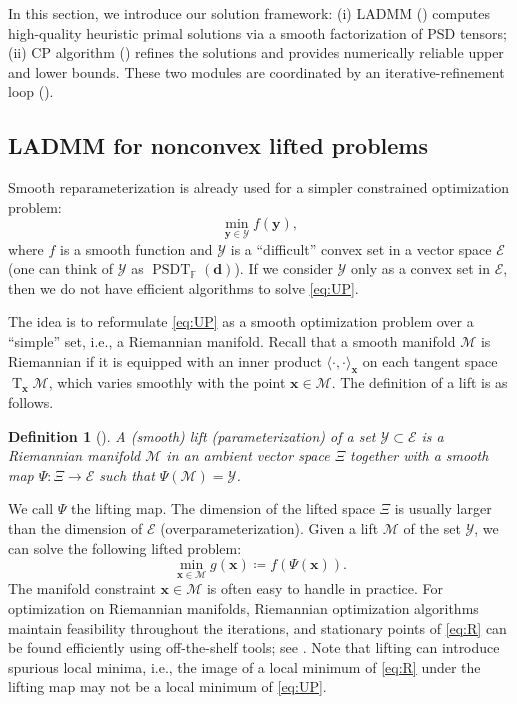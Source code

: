 \documentclass[smallextended]{svjour3}
\newtheorem{definition}{Definition}
\newcommand{\cE}{\mathcal E}
\newcommand{\cY}{\mathcal Y}
\newcommand{\F}{\mathbb F}
\newcommand{\cM}{\mathcal M}
\DeclareMathOperator{\SOST}{PSDT}
\newcommand{\1}{\mathbf{1}}
\newcommand{\x}{\mathbf{x}}
\newcommand{\y}{\mathbf{y}}
\DeclareMathOperator{\tang}{T}
\newcommand{\vc}[1]{\mathbf{#1}}
\newcommand{\vd}{\vc{d}}
\newcommand{\deq}{\coloneqq}
\begin{document}
In this section, we introduce our solution framework: (i) LADMM () computes high-quality heuristic primal solutions via a smooth factorization of PSD tensors; (ii) CP algorithm () refines the solutions and provides numerically reliable upper and lower bounds. These two modules are coordinated by an iterative-refinement loop ().

\subsection{LADMM for nonconvex lifted problems}
\label{sec.ladmm}

Smooth reparameterization is already used for a simpler constrained optimization problem:
\begin{equation}
    \label{eq:UP} \tag{P}
 \min_{\y \in \cY} f(\y),
\end{equation}
where \(f\) is a smooth function and \(\cY\) is a ``difficult'' convex set in a vector space \(\cE\) (one can think of \(\cY\) as \(\SOST_{\F}(\vd)\)). If we consider  \(\cY\) only as a convex set in \(\cE\), then we do not have efficient algorithms to solve \eqref{eq:UP}.

The idea is to reformulate \eqref{eq:UP} as a smooth optimization problem over a ``simple'' set, i.e., a Riemannian manifold. Recall that a smooth manifold \(\cM\) is Riemannian if it is equipped with an inner product \(\langle \cdot, \cdot \rangle_{\x}\) on each tangent space \(\tang_{\x}\cM\), which varies smoothly with the point \(\x\in\cM\). The definition of a lift is as follows.
 \begin{definition}[\cite{levin2025effect}]
     \label{def.lift}
     A (smooth) lift (parameterization) of a set \(\cY\subset\cE\) is a Riemannian manifold \(\cM\) in an ambient vector space \(\Xi\) together with a smooth map \(\Psi:\Xi\to\cE\) such that \(\Psi(\cM)=\cY\).
 \end{definition}
We call \(\Psi\) the lifting map. The dimension of the lifted space $\Xi$  is usually larger than the dimension of \(\cE\) (overparameterization). Given a lift \(\cM\) of the set \(\cY\), we can solve the following lifted problem:
\begin{equation}
    \label{eq:R} \tag{LiftedP}
    \min_{\x \in \cM} g(\x)\deq f(\Psi(\x)).
\end{equation}
The manifold constraint \(\x\in\cM\) is often easy to handle in practice. For optimization on Riemannian manifolds, Riemannian optimization algorithms maintain feasibility throughout the iterations, and stationary points of \eqref{eq:R} can be found efficiently using off-the-shelf tools; see \cite{bergmann2022manopt}. Note that lifting can introduce spurious local minima, i.e., the image of a local minimum of \eqref{eq:R} under the lifting map may not be a local minimum of \eqref{eq:UP}.
\end{document}
